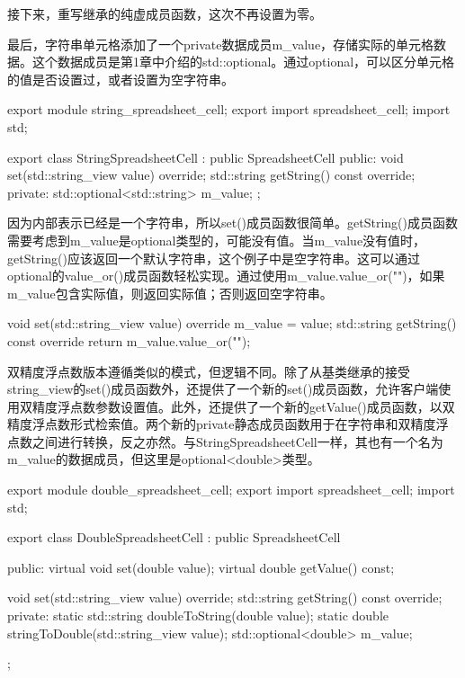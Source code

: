 接下来，重写继承的纯虚成员函数，这次不再设置为零。

最后，字符串单元格添加了一个private数据成员m\_value，存储实际的单元格数据。这个数据成员是第1章中介绍的std::optional。通过optional，可以区分单元格的值是否设置过，或者设置为空字符串。

\begin{cpp}
export module string_spreadsheet_cell;
export import spreadsheet_cell;
import std;

export class StringSpreadsheetCell : public SpreadsheetCell
{
    public:
        void set(std::string_view value) override;
        std::string getString() const override;
    private:
        std::optional<std::string> m_value;
};
\end{cpp}


因为内部表示已经是一个字符串，所以set()成员函数很简单。getString()成员函数需要考虑到m\_value是optional类型的，可能没有值。当m\_value没有值时，getString()应该返回一个默认字符串，这个例子中是空字符串。这可以通过optional的value\_or()成员函数轻松实现。通过使用m\_value.value\_or("")，如果m\_value包含实际值，则返回实际值；否则返回空字符串。

\begin{cpp}
void set(std::string_view value) override { m_value = value; }
std::string getString() const override { return m_value.value_or(""); }
\end{cpp}


双精度浮点数版本遵循类似的模式，但逻辑不同。除了从基类继承的接受string\_view的set()成员函数外，还提供了一个新的set()成员函数，允许客户端使用双精度浮点数参数设置值。此外，还提供了一个新的getValue()成员函数，以双精度浮点数形式检索值。两个新的private静态成员函数用于在字符串和双精度浮点数之间进行转换，反之亦然。与StringSpreadsheetCell一样，其也有一个名为m\_value的数据成员，但这里是optional<double>类型。

\begin{cpp}
export module double_spreadsheet_cell;
export import spreadsheet_cell;
import std;

export class DoubleSpreadsheetCell : public SpreadsheetCell
{
    public:
        virtual void set(double value);
        virtual double getValue() const;

        void set(std::string_view value) override;
        std::string getString() const override;
    private:
        static std::string doubleToString(double value);
        static double stringToDouble(std::string_view value);
        std::optional<double> m_value;
};
\end{cpp}

